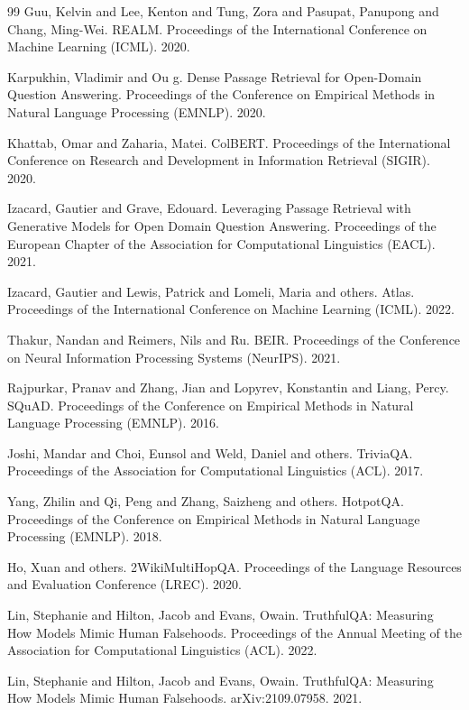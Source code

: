 \begin{thebibliography}{99}
Guu, Kelvin and Lee, Kenton and Tung, Zora and Pasupat, Panupong and Chang, Ming-Wei. REALM. Proceedings of the International Conference on Machine Learning (ICML). 2020.

Karpukhin, Vladimir and Ou g. Dense Passage Retrieval for Open-Domain Question Answering. Proceedings of the Conference on Empirical Methods in Natural Language Processing (EMNLP). 2020.

Khattab, Omar and Zaharia, Matei. ColBERT. Proceedings of the International Conference on Research and Development in Information Retrieval (SIGIR). 2020.

Izacard, Gautier and Grave, Edouard. Leveraging Passage Retrieval with Generative Models for Open Domain Question Answering. Proceedings of the European Chapter of the Association for Computational Linguistics (EACL). 2021.

Izacard, Gautier and Lewis, Patrick and Lomeli, Maria and others. Atlas. Proceedings of the International Conference on Machine Learning (ICML). 2022.

Thakur, Nandan and Reimers, Nils and Ru. BEIR. Proceedings of the Conference on Neural Information Processing Systems (NeurIPS). 2021.

Rajpurkar, Pranav and Zhang, Jian and Lopyrev, Konstantin and Liang, Percy. SQuAD. Proceedings of the Conference on Empirical Methods in Natural Language Processing (EMNLP). 2016.

Joshi, Mandar and Choi, Eunsol and Weld, Daniel and others. TriviaQA. Proceedings of the Association for Computational Linguistics (ACL). 2017.

Yang, Zhilin and Qi, Peng and Zhang, Saizheng and others. HotpotQA. Proceedings of the Conference on Empirical Methods in Natural Language Processing (EMNLP). 2018.

Ho, Xuan and others. 2WikiMultiHopQA. Proceedings of the Language Resources and Evaluation Conference (LREC). 2020.

Lin, Stephanie and Hilton, Jacob and Evans, Owain. TruthfulQA: Measuring How Models Mimic Human Falsehoods. Proceedings of the Annual Meeting of the Association for Computational Linguistics (ACL). 2022.

Lin, Stephanie and Hilton, Jacob and Evans, Owain. TruthfulQA: Measuring How Models Mimic Human Falsehoods. arXiv:2109.07958. 2021.


\end{thebibliography}
